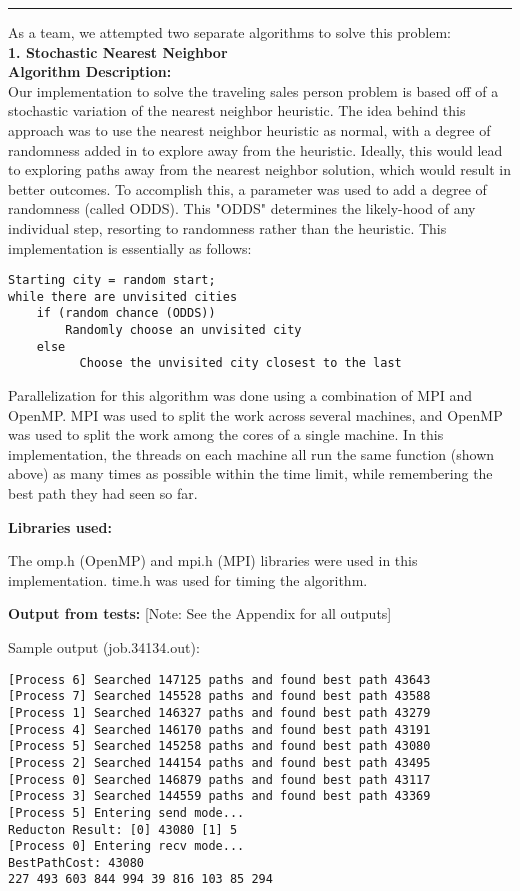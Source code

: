 \documentclass[letter, 12pt]{article}
\newenvironment{question}[1]{%
    \vspace{.2in}%
        \noindent{\bf #1}%
    \vspace{0.3em} \hrule \vspace{.1in}%
}{}
\begin{document}
\begin{question}{\large Traveling Salesperson Problem}

As a team, we attempted two separate algorithms to solve this problem:\\

{\large \textbf{1. Stochastic Nearest Neighbor}}\\


\textbf{Algorithm Description:}\\

Our implementation to solve the traveling sales person problem is based off of a stochastic variation of the nearest neighbor heuristic. The idea behind this approach was to use the nearest neighbor heuristic as normal, with a degree of randomness added in to explore away from the heuristic. Ideally, this would lead to exploring paths away from the nearest neighbor solution, which would result in better outcomes. To accomplish this, a parameter was used to add a degree of randomness (called ODDS). This "ODDS" determines the likely-hood of any individual step, resorting to randomness rather than the heuristic. This implementation is essentially as follows:\\

\begin{lstlisting}[style=CStyle]
Starting city = random start;
while there are unvisited cities
    if (random chance (ODDS))
        Randomly choose an unvisited city
    else
	      Choose the unvisited city closest to the last
\end{lstlisting}

\addtolength{\parskip}{\baselineskip}

Parallelization for this algorithm was done using a combination of MPI and OpenMP. MPI was used to split the work across several machines, and OpenMP was used to split the work among the cores of a single machine. In this implementation, the threads on each machine all run the same function (shown above) as many times as possible within the time limit, while remembering the best path they had seen so far.

\textbf{Libraries used:}

The omp.h (OpenMP) and mpi.h (MPI) libraries were used in this implementation. time.h was used for timing the algorithm.

\textbf{Output from tests:} [Note: See the Appendix for all outputs]

Sample output (job.34134.out):
\begin{lstlisting}[style=CStyle]
[Process 6] Searched 147125 paths and found best path 43643
[Process 7] Searched 145528 paths and found best path 43588
[Process 1] Searched 146327 paths and found best path 43279
[Process 4] Searched 146170 paths and found best path 43191
[Process 5] Searched 145258 paths and found best path 43080
[Process 2] Searched 144154 paths and found best path 43495
[Process 0] Searched 146879 paths and found best path 43117
[Process 3] Searched 144559 paths and found best path 43369
[Process 5] Entering send mode...
Reducton Result: [0] 43080 [1] 5
[Process 0] Entering recv mode...
BestPathCost: 43080
227 493 603 844 994 39 816 103 85 294 
\end{lstlisting}


\end{question}
\end{document}
